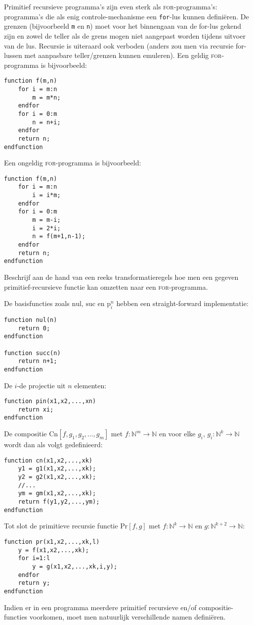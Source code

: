 \documentclass[fleqn]{article}
\newcommand{\NN}{\ensuremath{\mathbb{N}}}
\begin{document}
\begin{question}
Primitief recursieve programma's zijn even sterk als \textsc{for}-programma's: programma's die als enig controle-mechanisme een \verb+for+-lus kunnen defini\"eren. De grenzen (bijvoorbeeld \verb+m+ en \verb+n+) moet voor het binnengaan van de for-lus gekend zijn en zowel de teller als de grens mogen niet aangepast worden tijdens uitvoer van de lus. Recursie is uiteraard ook verboden (anders zou men via recursie for-lussen met aanpasbare teller/grenzen kunnen emuleren). Een geldig \textsc{for}-programma is bijvoorbeeld:
\begin{verbatim}
function f(m,n)
    for i = m:n
        m = m*n;
    endfor
    for i = 0:m
        n = n+i;
    endfor
    return n;
endfunction
\end{verbatim}
Een ongeldig \textsc{for}-programma is bijvoorbeeld:
\begin{verbatim}
function f(m,n)
    for i = m:n
        i = i*m;
    endfor
    for i = 0:m
        m = m-i;
        i = 2*i;
        n = f(m+1,n-1);
    endfor
    return n;
endfunction
\end{verbatim}
Beschrijf aan de hand van een reeks transformatieregels hoe men een gegeven primitief-recursieve functie kan omzetten naar een \textsc{for}-programma.
\end{question}
\begin{answer}
De basisfuncties zoals $\mbox{nul}$, $\mbox{suc}$ en $\mbox{p}_i^n$ hebben een straight-forward implementatie:
\begin{verbatim}
function nul(n)
    return 0;
endfunction

function succ(n)
    return n+1;
endfunction
\end{verbatim}
De $i$-de projectie uit $n$ elementen:
\begin{verbatim}
function pin(x1,x2,...,xn)
    return xi;
endfunction
\end{verbatim}
De compositie $\mbox{Cn}\left[f,g_1,g_2,\ldots,g_m\right]$ met $f:\NN^m\rightarrow\NN$ en voor elke $g_i$, $g_i:\NN^k\rightarrow\NN$ wordt dan als volgt gedefinieerd:
\begin{verbatim}
function cn(x1,x2,...,xk)
    y1 = g1(x1,x2,...,xk);
    y2 = g2(x1,x2,...,xk);
    //...
    ym = gm(x1,x2,...,xk);
    return f(y1,y2,...,ym);
endfunction
\end{verbatim}
Tot slot de primitieve recursie functie $\mbox{Pr}\left[f,g\right]$ met $f:\NN^k\rightarrow\NN$ en $g:\NN^{k+2}\rightarrow\NN$:
\begin{verbatim}
function pr(x1,x2,...,xk,l)
    y = f(x1,x2,...,xk);
    for i=1:l
        y = g(x1,x2,...,xk,i,y);
    endfor
    return y;
endfunction
\end{verbatim}
\end{answer}
Indien er in een programma meerdere primitief recursieve en/of compositie-functies voorkomen, moet men natuurlijk verschillende namen defini\"eren.
\end{document}

